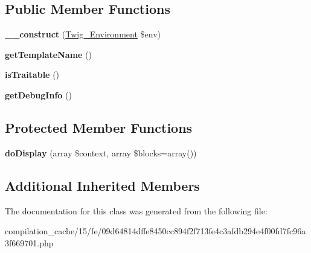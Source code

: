 \subsection*{Public Member Functions}
\begin{DoxyCompactItemize}
\item 
\hypertarget{class_____twig_template__15fe09d64814dffe8450cc894f2f713fe4c3afdb294e4f00fd7fc96a3f669701_a4f8326243132c1450a81e0a817aa1be7}{}{\bfseries \+\_\+\+\_\+construct} (\hyperlink{class_twig___environment}{Twig\+\_\+\+Environment} \$env)\label{class_____twig_template__15fe09d64814dffe8450cc894f2f713fe4c3afdb294e4f00fd7fc96a3f669701_a4f8326243132c1450a81e0a817aa1be7}

\item 
\hypertarget{class_____twig_template__15fe09d64814dffe8450cc894f2f713fe4c3afdb294e4f00fd7fc96a3f669701_a621a3ccd148ed8b9e937da6959c98f39}{}{\bfseries get\+Template\+Name} ()\label{class_____twig_template__15fe09d64814dffe8450cc894f2f713fe4c3afdb294e4f00fd7fc96a3f669701_a621a3ccd148ed8b9e937da6959c98f39}

\item 
\hypertarget{class_____twig_template__15fe09d64814dffe8450cc894f2f713fe4c3afdb294e4f00fd7fc96a3f669701_aa9eb89be270f6afc256ef5e272b78a63}{}{\bfseries is\+Traitable} ()\label{class_____twig_template__15fe09d64814dffe8450cc894f2f713fe4c3afdb294e4f00fd7fc96a3f669701_aa9eb89be270f6afc256ef5e272b78a63}

\item 
\hypertarget{class_____twig_template__15fe09d64814dffe8450cc894f2f713fe4c3afdb294e4f00fd7fc96a3f669701_abd0ecb0136f4228db2bd963bfc1e20d7}{}{\bfseries get\+Debug\+Info} ()\label{class_____twig_template__15fe09d64814dffe8450cc894f2f713fe4c3afdb294e4f00fd7fc96a3f669701_abd0ecb0136f4228db2bd963bfc1e20d7}

\end{DoxyCompactItemize}
\subsection*{Protected Member Functions}
\begin{DoxyCompactItemize}
\item 
\hypertarget{class_____twig_template__15fe09d64814dffe8450cc894f2f713fe4c3afdb294e4f00fd7fc96a3f669701_adb62b7c226e07d30f836ed16158d924f}{}{\bfseries do\+Display} (array \$context, array \$blocks=array())\label{class_____twig_template__15fe09d64814dffe8450cc894f2f713fe4c3afdb294e4f00fd7fc96a3f669701_adb62b7c226e07d30f836ed16158d924f}

\end{DoxyCompactItemize}
\subsection*{Additional Inherited Members}


The documentation for this class was generated from the following file\+:\begin{DoxyCompactItemize}
\item 
compilation\+\_\+cache/15/fe/09d64814dffe8450cc894f2f713fe4c3afdb294e4f00fd7fc96a3f669701.\+php\end{DoxyCompactItemize}
